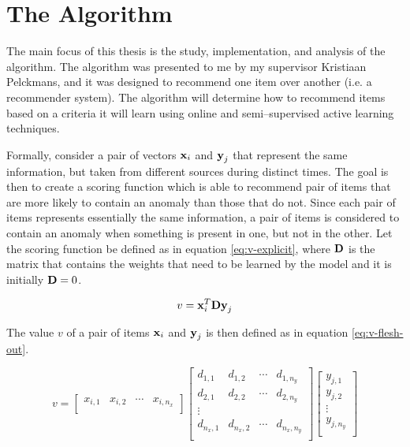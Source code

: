 \section{The \mlblink Algorithm} \label{sect:theory:ml-blink}

The main focus of this thesis is the study, implementation, and analysis of the \mlblink algorithm. The \mlblink algorithm was presented to me by my supervisor Kristiaan Pelckmans, and it was designed to recommend one item over another (i.e. a recommender system). The \mlblink algorithm will determine how to recommend items based on a criteria it will learn using online and semi--supervised active learning techniques.  \newline

Formally, consider a pair of vectors $\boldsymbol{\mathbf{x}}_i$ and $\boldsymbol{\mathbf{y}}_j$ that represent the same information, but taken from different sources during distinct times. The goal is then to create a scoring function which is able to recommend pair of items that are more likely to contain an anomaly than those that do not. Since each pair of items represents essentially the same information, a pair of items is considered to contain an anomaly when something is present in one, but not in the other. Let the scoring function be defined as in equation \ref{eq:v-explicit}, where $\boldsymbol{\mathbf{D}}$ is the matrix that contains the weights that need to be learned by the model and it is initially $\boldsymbol{\mathbf{D}} = 0$.

\begin{equation} \label{eq:v-explicit}
  v = \boldsymbol{\mathbf{x}}_{i}^{T} \boldsymbol{\mathbf{D}} \boldsymbol{\mathbf{y}}_j  
\end{equation}

The value $v$ of a pair of items $\boldsymbol{\mathbf{x}}_i$ and $\boldsymbol{\mathbf{y}}_j$ is then defined as in equation \ref{eq:v-flesh-out}.

\begin{equation} \label{eq:v-flesh-out}
    v = 
    \begin{bmatrix}
        x_{i,1} & x_{i,2} & \cdots & x_{i,n_x} \\
    \end{bmatrix}
    \begin{bmatrix}
        d_{1,1} & d_{1,2} & \cdots & d_{1,n_y} \\
        d_{2,1} & d_{2,2} & \cdots & d_{2,n_y} \\
        \vdots \\
        d_{n_x,1} & d_{n_x,2} & \cdots & d_{n_x,n_y} \\
    \end{bmatrix}
    \begin{bmatrix}
        y_{j,1} \\
        y_{j,2} \\
        \vdots  \\
        y_{j,n_y} \\
    \end{bmatrix}
\end{equation}


